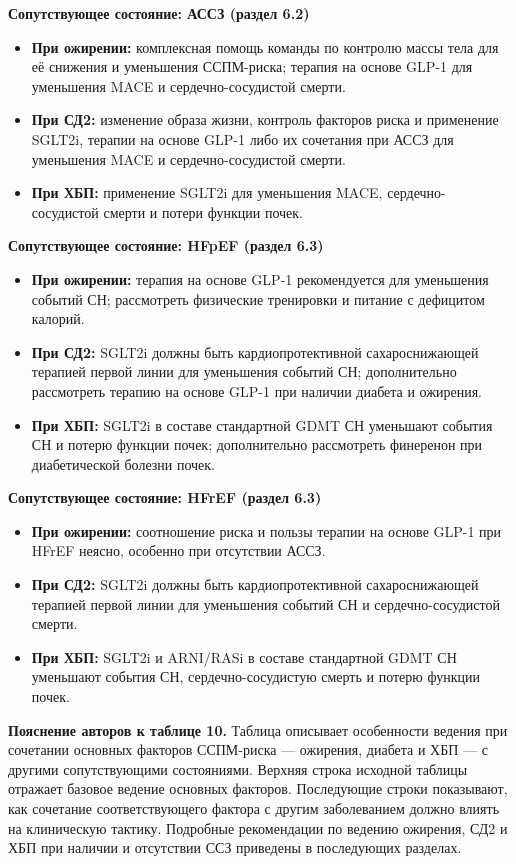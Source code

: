 \documentclass[11pt,a4paper]{article}
\newcommand{\heading}[1]{\par\medskip\textbf{#1}\par}
\begin{document}
\heading{Сопутствующее состояние: АССЗ (раздел 6.2)}
\begin{itemize}
\item \textbf{При ожирении:} комплексная помощь команды по контролю массы тела для её снижения и уменьшения ССПМ-риска; терапия на основе GLP-1 для уменьшения MACE и сердечно-сосудистой смерти.
\item \textbf{При СД2:} изменение образа жизни, контроль факторов риска и применение SGLT2i, терапии на основе GLP-1 либо их сочетания при АССЗ для уменьшения MACE и сердечно-сосудистой смерти.
\item \textbf{При ХБП:} применение SGLT2i для уменьшения MACE, сердечно-сосудистой смерти и потери функции почек.
\end{itemize}

\heading{Сопутствующее состояние: HFpEF (раздел 6.3)}
\begin{itemize}
\item \textbf{При ожирении:} терапия на основе GLP-1 рекомендуется для уменьшения событий СН; рассмотреть физические тренировки и питание с дефицитом калорий.
\item \textbf{При СД2:} SGLT2i должны быть кардиопротективной сахароснижающей терапией первой линии для уменьшения событий СН; дополнительно рассмотреть терапию на основе GLP-1 при наличии диабета и ожирения.
\item \textbf{При ХБП:} SGLT2i в составе стандартной GDMT СН уменьшают события СН и потерю функции почек; дополнительно рассмотреть финеренон при диабетической болезни почек.
\end{itemize}

\heading{Сопутствующее состояние: HFrEF (раздел 6.3)}
\begin{itemize}
\item \textbf{При ожирении:} соотношение риска и пользы терапии на основе GLP-1 при HFrEF неясно, особенно при отсутствии АССЗ.
\item \textbf{При СД2:} SGLT2i должны быть кардиопротективной сахароснижающей терапией первой линии для уменьшения событий СН и сердечно-сосудистой смерти.
\item \textbf{При ХБП:} SGLT2i и ARNI/RASi в составе стандартной GDMT СН уменьшают события СН, сердечно-сосудистую смерть и потерю функции почек.
\end{itemize}

\textbf{Пояснение авторов к таблице 10.} Таблица описывает особенности ведения при сочетании основных факторов ССПМ-риска --- ожирения, диабета и ХБП --- с другими сопутствующими состояниями. Верхняя строка исходной таблицы отражает базовое ведение основных факторов. Последующие строки показывают, как сочетание соответствующего фактора с другим заболеванием должно влиять на клиническую тактику. Подробные рекомендации по ведению ожирения, СД2 и ХБП при наличии и отсутствии ССЗ приведены в последующих разделах.
\end{document}
